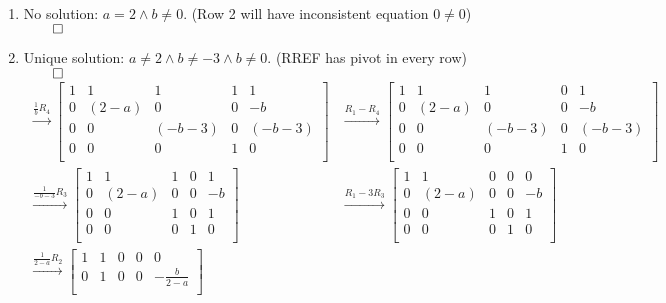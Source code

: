\documentclass[12pt, a4paper]{article}
\begin{document}
\begin{enumerate}[Q\arabic*.]
    \begin{enumerate}[(\alph*)]
      \item No solution: $a = 2 \land b \neq 0$. (Row 2 will have inconsistent equation $0 \neq 0$)$\qed$
      \item Unique solution: $a \neq 2 \land b \neq -3 \land b \neq 0$. (RREF has pivot in every row)$\qed$\\
        \begin{align*}
          \xrightarrow{\frac{1}{b}R_4}
          \begin{bmatrix}
            1 & 1 & 1 & 1 & 1\\
            0 & (2-a) & 0 & 0 & -b\\
            0 & 0 & (-b-3) & 0 & (-b-3)\\
            0 & 0 & 0 & 1 & 0\\
          \end{bmatrix}
          &\xrightarrow{R_1-R_4}
          \begin{bmatrix}
            1 & 1 & 1 & 0 & 1\\
            0 & (2-a) & 0 & 0 & -b\\
            0 & 0 & (-b-3) & 0 & (-b-3)\\
            0 & 0 & 0 & 1 & 0\\
          \end{bmatrix}\\
          \xrightarrow{\frac{1}{-b-3}R_3}
          \begin{bmatrix}
            1 & 1 & 1 & 0 & 1\\
            0 & (2-a) & 0 & 0 & -b\\
            0 & 0 & 1 & 0 & 1\\
            0 & 0 & 0 & 1 & 0\\
          \end{bmatrix}
          &\xrightarrow{R_1-3R_3}
          \begin{bmatrix}
            1 & 1 & 0 & 0 & 0\\
            0 & (2-a) & 0 & 0 & -b\\
            0 & 0 & 1 & 0 & 1\\
            0 & 0 & 0 & 1 & 0\\
          \end{bmatrix}\\
          \xrightarrow{\frac{1}{2-a}R_2}
          \begin{bmatrix}
            1 & 1 & 0 & 0 & 0\\
            0 & 1 & 0 & 0 & -\frac{b}{2-a}\\

\end{bmatrix}
\end{align*}
\end{enumerate}
\end{enumerate}
\end{document}
